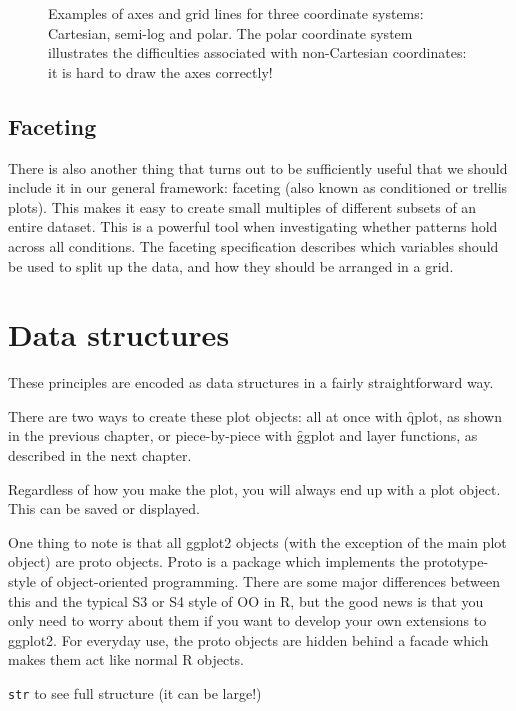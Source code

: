\begin{figure}[htbp]
  \centering
  \caption{Examples of axes and grid lines for three coordinate systems: Cartesian, semi-log and polar. The polar coordinate system illustrates the difficulties associated with non-Cartesian coordinates: it is hard to draw the axes correctly!}
  \label{fig:coord}
\end{figure}

\subsection{Faceting}\label{sec:faceting}

There is also another thing that turns out to be sufficiently useful that we should include it in our general framework: faceting (also known as conditioned or trellis plots). This makes it easy to create small multiples of different subsets of an entire dataset. This is a powerful tool when investigating whether patterns hold across all conditions.  The faceting specification describes which variables should be used to split up the data, and how they should be arranged in a grid.

\section{Data structures}
\label{sec:data_structures}

These principles are encoded as data structures in a fairly straightforward way.

There are two ways to create these plot objects: all at once with \f{qplot}, as shown in the previous chapter, or piece-by-piece with \f{ggplot} and layer functions, as described in the next chapter.

Regardless of how you make the plot, you will always end up with a plot object.  This can be saved or displayed.

One thing to note is that all ggplot2 objects (with the exception of the main plot object) are proto objects.  Proto is a package which implements the prototype-style of object-oriented programming.  There are some major differences between this and the typical S3 or S4 style of OO in R, but the good news is that you only need to worry about them if you want to develop your own extensions to ggplot2.  For everyday use, the proto objects are hidden behind a facade which makes them act like normal R objects.

{\tt str} to see full structure (it can be large!)

